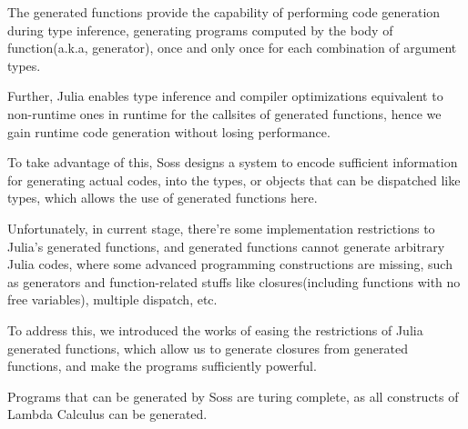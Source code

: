 \documentclass[anonymous=false, %
               format=acmsmall, %
               review=true, %
               screen=true, %
               nonacm=true]{acmart}
\begin{document}
The generated functions provide the capability of performing code generation during type inference, generating programs computed by the body of function(a.k.a, generator), once and only once for each combination of argument types.

Further, Julia enables type inference and compiler optimizations equivalent to non-runtime ones in runtime for the callsites of generated functions, hence we gain runtime code generation without losing performance.

To take advantage of this, Soss designs a system to encode sufficient information for generating actual codes, into the types, or objects that can be dispatched like types, which allows the use of generated functions here.

Unfortunately, in current stage, there're some implementation restrictions to Julia's generated functions, and generated functions cannot generate arbitrary Julia codes,
where some advanced programming constructions are missing, such as generators and function-related stuffs like closures(including functions with no free variables), multiple dispatch, etc.

To address this, we introduced the works of easing the restrictions of Julia generated functions,
which allow us to generate closures from generated functions, and make the programs sufficiently powerful.

Programs that can be generated by Soss are turing complete, as all constructs of Lambda Calculus can be generated.

  

  
  
  
\end{document}
